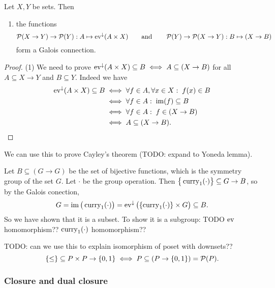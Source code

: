 \begin{proposition} \label{curryingGaloisConnections}
Let $X,Y$ be sets. Then
\begin{enumerate}
\item the functions
\[ \operatorname{\mathcal{P}}(X\to Y)\to \operatorname{\mathcal{P}}(Y): A \mapsto \operatorname{ev}^\downarrow(A\times X) \qquad\text{and}\qquad \operatorname{\mathcal{P}}(Y)\to \operatorname{\mathcal{P}}(X\to Y): B\mapsto (X\to B) \]
form a Galois connection.
\end{enumerate}
\end{proposition}
\begin{proof}
(1) We need to prove $\operatorname{ev}^\downarrow(A\times X) \subseteq B \iff A\subseteq (X\to B)$ for all $A\subseteq X\to Y$ and $B\subseteq Y$. Indeed we have
\begin{align*}
\operatorname{ev}^\downarrow(A\times X) \subseteq B &\iff \forall f\in A, \forall x\in X: \; f(x)\in B \\
&\iff \forall f\in A: \; \operatorname{im}(f)\subseteq B \\
&\iff \forall f\in A: \; f \in (X\to B) \\
&\iff A \subseteq (X\to B).
\end{align*}
\end{proof}

\begin{note}
We can use this to prove Cayley's theorem (TODO: expand to Yoneda lemma).

Let $B \subseteq (G\to G)$ be the set of bijective functions, which is the symmetry group of the set $G$. Let $\cdot$ be the group operation. Then $\big\{\operatorname{curry}_1(\cdot)\big\} \subseteq G\to B$, so by the Galois conection,
\[ G = \operatorname{im}\big(\operatorname{curry}_1(\cdot)\big) = \operatorname{ev}^\downarrow\big(\{\operatorname{curry}_1(\cdot)\}\times G\big) \subseteq B.  \]
So we have shown that it is a subset. To show it is a subgroup: TODO $\operatorname{ev}$ homomorphism?? $\operatorname{curry}_1(\cdot)$ homomorphism??
\end{note}

\begin{note}
TODO: can we use this to explain isomorphism of poset with downsets??
\[ \{\leq\} \subseteq P\times P \to \{0,1\} \iff P \subseteq (P\to \{0,1\}) = \operatorname{\mathcal{P}}(P). \]
\end{note}

\subsubsection{Closure and dual closure}

